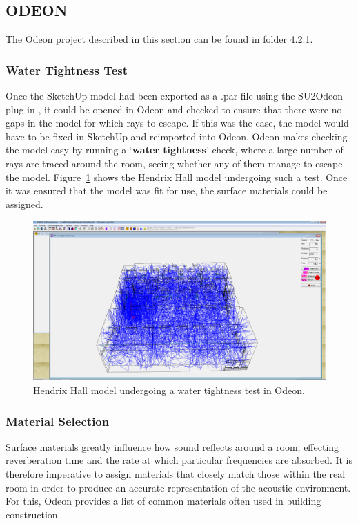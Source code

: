 \documentclass[../../main.tex]{subfiles}
\begin{document}
\subsection{ODEON}

	The Odeon project described in this section can be found in folder 4.2.1.

	\label{odeon}
	\subsubsection{Water Tightness Test}
		Once the SketchUp model had been exported as a .par file using the SU2Odeon plug-in \cite{SU2Odeon}, it could be opened in Odeon and checked to ensure that there were no gaps in the model for which rays to escape. If this was the case, the model would have to be fixed in SketchUp and reimported into Odeon. Odeon makes checking the model easy by running a `\textbf{water tightness}' check, where a large number of rays are traced around the room, seeing whether any of them manage to escape the model. Figure~\ref{watertight} shows the Hendrix Hall model undergoing such a test. Once it was ensured that the model was fit for use, the surface materials could be assigned.

		\begin{figure}[H]
			\centerline{\includegraphics[scale = 0.3]{Sections/Implementation/Odeon/images/OdeonRays/waterTight2.PNG}}
			\caption{Hendrix Hall model undergoing a water tightness test in Odeon.}
			\label{watertight}
		\end{figure}

	\subsubsection{Material Selection}
	\label{odeon:materials}
		Surface materials greatly influence how sound reflects around a room, effecting reverberation time and the rate at which particular frequencies are absorbed. It is therefore imperative to assign materials that closely match those within the real room in order to produce an accurate representation of the acoustic environment. For this, Odeon provides a list of common materials often used in building construction.
\end{document}
